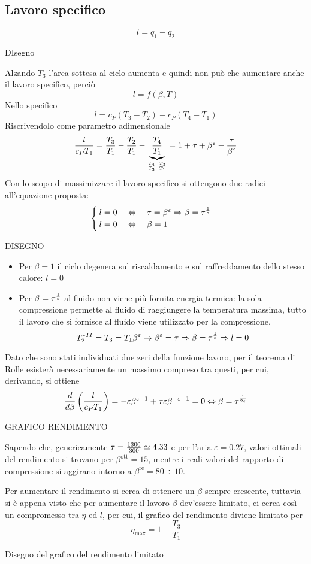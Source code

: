 \subsection{Lavoro specifico}
\begin{adjustwidth}{2in}{}
	\[l = q_1-q_2\]
	
	DIsegno
	
	Alzando $T_3$ l'area sottesa al ciclo aumenta e quindi non può che aumentare anche il lavoro specifico, perciò
	\[l = f(\beta, T)\]
	Nello specifico
	\[l = c_P(T_3-T_2) - c_P(T_4-T_1)\]
	Riscrivendolo come parametro adimensionale
	\[\dfrac{l}{c_PT_1} = \dfrac{T_3}{T_1}-\dfrac{T_2}{T_1}-\underbrace{\dfrac{T_4}{T_1}}_{{T_4\over T_3}\cdot{T_3\over T_1}} = 1+\tau+\beta^\varepsilon - \dfrac{\tau}{\beta^\varepsilon}\]
	Con lo scopo di massimizzare il lavoro specifico si ottengono due radici all'equazione proposta:
	\[\begin{aligned}
		\begin{cases}
			l=0\quad  \Leftrightarrow \quad  \tau = \beta^\varepsilon \Rightarrow \beta = \tau^{1\over\varepsilon} \\
			l=0 \quad \Leftrightarrow \quad \beta = 1
		\end{cases}
	\end{aligned}\]
	
	DISEGNO
	
	\begin{itemize}
		\item Per $\beta=1$ il ciclo degenera sul riscaldamento e sul raffreddamento dello stesso calore: $l=0$
		\item Per $\beta = \tau^{1\over\varepsilon}$ al fluido non viene più fornita energia termica: la sola compressione permette al fluido di raggiungere la temperatura massima, tutto il lavoro che si fornisce al fluido viene utilizzato per la compressione. 
		\[T_2^{*II} = T_3 = T_1\beta^\varepsilon \rightarrow \beta^\varepsilon = \tau \Rightarrow \beta = \tau^{1\over\varepsilon} \Rightarrow l=0\]
	\end{itemize}
	Dato che sono stati individuati due zeri della funzione lavoro, per il teorema di Rolle esisterà necessariamente un massimo compreso tra questi, per cui, derivando, si ottiene 
	\[\dfrac{d}{d\beta}\left(\dfrac{l}{c_PT_1}\right) = -\varepsilon\beta^{\varepsilon-1}+\tau\varepsilon\beta^{-\varepsilon-1} = 0 \Leftrightarrow \beta = \tau^{1\over2\varepsilon} \]
	
	GRAFICO RENDIMENTO 
	
	Sapendo che, genericamente $\tau = {1300\over300}\simeq4.33$ e per l'aria $\varepsilon=0.27$, valori ottimali del rendimento si trovano per $\beta^\text{ott}=15$, mentre i reali valori del rapporto di compressione si aggirano intorno a $\beta^\text{re} = 80\div10$. \newline 
	
	Per aumentare il rendimento si cerca di ottenere un $\beta$ sempre crescente, tuttavia si è appena visto che per aumentare il lavoro $\beta$ dev'essere limitato, ci cerca così un compromesso tra $\eta$ ed $l$, per cui, il grafico del rendimento diviene limitato per 
	\[\eta_{\max} = 1- \dfrac{T_3}{T_1}\]
	
	Disegno del grafico del rendimento limitato
\end{adjustwidth}	
